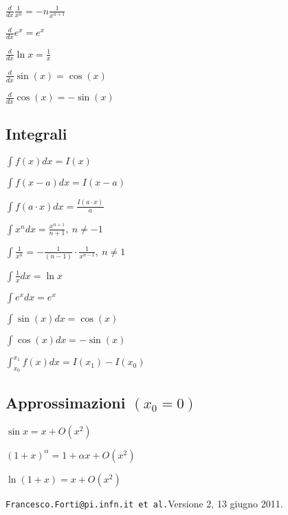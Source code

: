 \documentclass[10pt]{article}
\newcommand{\versione}{Versione 2}
\newcommand{\data}{ 13 giugno 2011}
\begin{document}
\begin{multicols}{3}
$\frac d {dx} \frac 1 {x^n} = -n \frac 1 {x^{n+1}}$

$\frac d {dx} e^x = e^x$

$\frac d {dx} \ln x = \frac 1 x$

$\frac d {dx} \sin(x) = \cos (x)$

$\frac d {dx} \cos(x) = -\sin(x)$

\subsection*{Integrali}

$\displaystyle\int f(x) dx = I(x)$

$\displaystyle\int f(x-a) dx = I(x-a)$

$\displaystyle\int f(a\cdot x) dx = \frac {I(a\cdot x)} {a}$

$\displaystyle \int x^n dx = \frac {x^{n+1}} {n+1},\:n\neq -1$

$\displaystyle\int \frac 1 {x^n} = - \frac 1 {(n-1)} \cdot\frac 1 { x^{n-1}},\: n\neq 1$

$\displaystyle\int \frac 1 x dx = \ln x$

$\displaystyle\int e^x dx = e^x$

$\displaystyle\int \sin(x) dx = \cos(x)$

$\displaystyle \int \cos(x) dx = -\sin(x)$

$\displaystyle \int_{x_0}^{x_1} f(x) dx = I(x_1) - I(x_0)$

\subsection*{Approssimazioni $(x_0 = 0)$}

$\sin{x} = x + O(x^2)$

$(1+x)^{\alpha} = 1 + \alpha x + O(x^2)$

$\ln(1+x) = x + O(x^2)$




\end{multicols}

\vfill

{\tt Francesco.Forti@pi.infn.it et al.}\hfill  \versione , \data.
\end{document}
